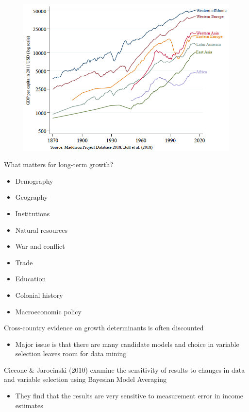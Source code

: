 \documentclass{beamer}
\begin{document}
\begin{frame}
  \begin{figure}
    \includegraphics[scale=1.2]{bolt_et_al.eps}
  \end{figure}  
\end{frame}

\begin{frame}
  What matters for long-term growth?
  \begin{itemize}
    \item Demography
    \item Geography
    \item Institutions
    \item Natural resources
    \item War and conflict
    \item Trade
    \item Education
    \item Colonial history
    \item Macroeconomic policy
  \end{itemize}
\end{frame}

\begin{frame}
  Cross-country evidence on growth determinants is often discounted
  \begin{itemize}
    \item Major issue is that there are many candidate models and choice in variable selection leaves room for data mining
  \end{itemize}
  \medskip
  Ciccone \& Jarocinski (2010) examine the sensitivity of results to changes in data and variable selection using Bayesian Model Averaging
  \begin{itemize}
    \item They find that the results are very sensitive to measurement error in income estimates
  \end{itemize}  
\end{frame}
\end{document}
